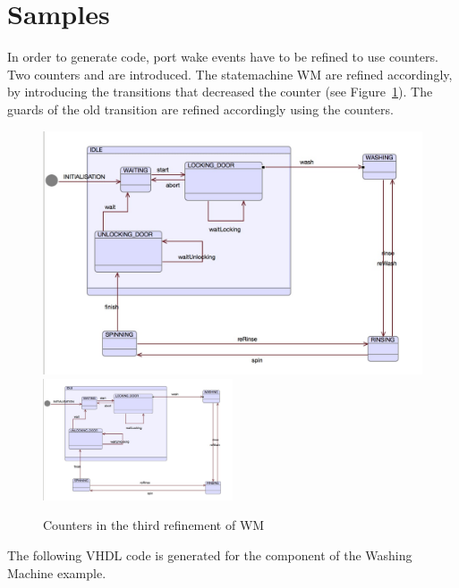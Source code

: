 \section{Samples}
\label{sec:vhdl-samples}

In order to generate code, port wake events have to be refined to use counters. Two counters  and  are introduced. The statemachine WM are refined accordingly, by introducing the transitions that decreased the counter (see Figure~\ref{fig:m3-WM}). The guards of the old transition are refined accordingly using the counters.
\begin{figure}[!htbp]
  \centering
  \ifplastex
  \includegraphics[width=512]{figures/vhdl-WM-m3_WM}
  \else
  \includegraphics[width=0.5\textwidth]{figures/vhdl-WM-m3_WM}
  \fi
  \caption{Counters in the third refinement of WM}
  \label{fig:m3-WM}
\end{figure}


The following VHDL code is generated for the  component of the Washing Machine example.

